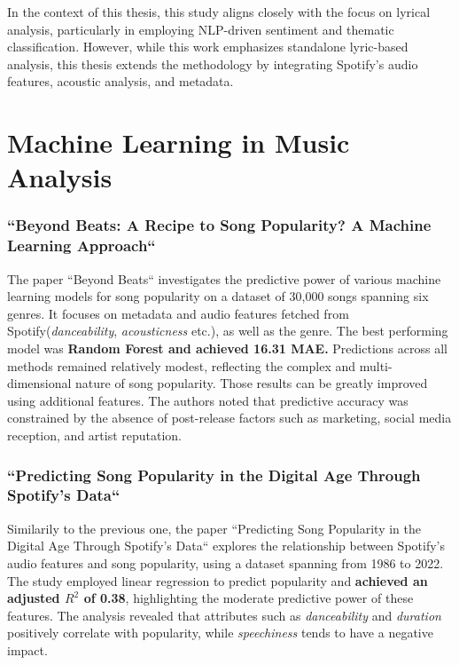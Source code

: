 In the context of this thesis, this study aligns closely with the focus on
lyrical analysis, particularly in employing NLP-driven sentiment and thematic
classification. However, while this work emphasizes standalone lyric-based
analysis, this thesis extends the methodology by integrating Spotify’s audio
features, acoustic analysis, and metadata. 


\section{Machine Learning in Music Analysis}
\label{sec:machinelearningfeaturesinmusicanalysis}

\subsubsection*{``Beyond Beats: A Recipe to Song Popularity? A Machine Learning Approach``}

The paper ``Beyond Beats`` investigates the predictive power of various machine
learning models for song popularity on a dataset of 30,000 songs spanning six
genres. It focuses on metadata and audio features fetched from
Spotify(\textit{danceability}, \textit{acousticness} etc.), as well as the
genre. The best performing model was \textbf{Random Forest and achieved 16.31 MAE.}
Predictions across all methods remained relatively modest, reflecting the
complex and multi-dimensional  nature of song popularity. Those results can be
greatly improved using additional features. The authors noted that predictive
accuracy was constrained by the absence of post-release factors such as
marketing, social media reception, and artist reputation.\cite{beyond_beats}


\subsubsection*{``Predicting Song Popularity in the Digital Age Through
Spotify’s Data``}  
Similarily to the previous one, the paper ``Predicting Song Popularity in the
Digital Age Through Spotify’s Data`` explores the relationship between
Spotify's audio features  and song popularity, using a dataset spanning from
1986 to 2022. The study employed linear regression to predict popularity and
\textbf{achieved an adjusted $R^2$ of 0.38}, highlighting the moderate
predictive power of these features. The analysis revealed that attributes such
as \textit{danceability} and \textit{duration} positively correlate with
popularity, while \textit{speechiness} tends to have a negative
impact.\cite{predicting_song_popularity_2024}
